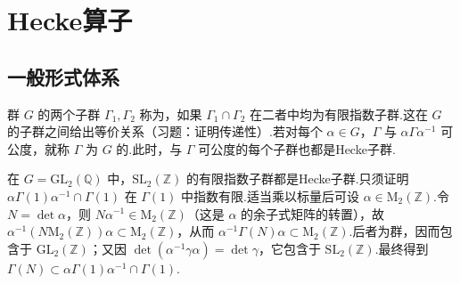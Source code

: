 
\section{Hecke算子}\label{sec:modular-1-3}

\subsection{一般形式体系}\label{sec:modular-1-3-1}

群 $G$ 的两个子群 $\Gamma_1,\Gamma_2$ 称为，如果 $\Gamma_1\cap\Gamma_2$ 在二者中均为有限指数子群.这在 $G$ 的子群之间给出等价关系（习题：证明传递性）.若对每个 $\alpha\in G$，$\Gamma$ 与 $\alpha\Gamma\alpha^{-1}$ 可公度，就称 $\Gamma$ 为 $G$ 的.此时，与 $\Gamma$ 可公度的每个子群也都是Hecke子群.

\begin{example*}

在 $G=\mathrm{GL}_2(\mathbb Q)$ 中，$\mathrm{SL}_2(\mathbb Z)$ 的有限指数子群都是Hecke子群.只须证明 $\alpha\Gamma(1)\alpha^{-1}\cap\Gamma(1)$ 在 $\Gamma(1)$ 中指数有限.适当乘以标量后可设 $\alpha\in\mathrm M_2(\mathbb Z)$.令 $N=\det\alpha$，则 $N\alpha^{-1}\in\mathrm M_2(\mathbb Z)$（这是 $\alpha$ 的余子式矩阵的转置），故 $\alpha^{-1}(N\mathrm M_2(\mathbb Z))\alpha\subset\mathrm M_2(\mathbb Z)$，从而 $\alpha^{-1}\Gamma(N)\alpha\subset\mathrm M_2(\mathbb Z)$.后者为群，因而包含于 $\mathrm{GL}_2(\mathbb Z)$；又因 $\det(\alpha^{-1}\gamma\alpha)=\det\gamma$，它包含于 $\mathrm{SL}_2(\mathbb Z)$.最终得到 $\Gamma(N)\subset\alpha\Gamma(1)\alpha^{-1}\cap\Gamma(1)$.

\end{example*}

